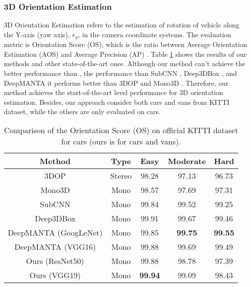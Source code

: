 \subsubsection{3D Orientation Estimation}
3D Orientation Estimation refers to the estimation of rotation of vehicle along the Y-axis (yaw axis), $r_y$, in the camera coordinate systems. The evaluation metric is Orientation Score (OS), which is the ratio between Average Orientation Estimation (AOS) and Average Precision (AP) \cite{DBLP:journals/corr/MousavianAFK16}. Table \ref{os_cmp} shows the results of our methods and other state-of-the-art ones. Although our method can't achieve the better performance than , the performance than SubCNN \cite{DBLP:journals/corr/XiangCLS16},  Deep3DBox \cite{DBLP:journals/corr/MousavianAFK16}, and DeepMANTA \cite{DBLP:journals/corr/ChabotCRTC17} it performs better than 3DOP \cite{Chen:2015:OPA:2969239.2969287} and Mono3D \cite{cvpr16chen}.  Therefore, our method achieves the start-of-the-art level performance for 3D orientation estimation. Besides, our approach consider both cars and vans from KITTI dataset, while the others are only evaluated on cars.

\begin{table}[H]
	\centering
	\caption{Comparison of the Orientation Score (OS) on official KITTI dataset for cars (ours is for cars and vans).}
	\label{os_cmp}
\begin{tabular}{|c|c|c|c|c|}
	\hline
	Method                                                                        & Type   & Easy           & Moderate       & Hard           \\ \hline
	3DOP \cite{Chen:2015:OPA:2969239.2969287}                    & Stereo & 98.28          & 97.13          & 96.73          \\ \hline
	Mono3D \cite{cvpr16chen}                                     & Mono   & 98.57          & 97.69          & 97.31          \\ \hline
	SubCNN \cite{DBLP:journals/corr/XiangCLS16}                  & Mono   & 99.84          & 99.52          & 99.25          \\ \hline
	Deep3DBox \cite{DBLP:journals/corr/MousavianAFK16}           & Mono   & 99.91 & 99.67          & 99.46          \\ \hline
	DeepMANTA (GoogLeNet) \cite{DBLP:journals/corr/ChabotCRTC17} & Mono   & 99.85          & \textbf{99.75} & \textbf{99.55} \\ \hline
	DeepMANTA (VGG16) \cite{DBLP:journals/corr/ChabotCRTC17}     & Mono   & 99.88          & 99.69          & 99.49          \\ \hline
	Ours (ResNet50)                                                               & Mono   & 99.88          & 98.78          & 97.39          \\ \hline
	Ours (VGG19)																	& Mono	 & \textbf{99.94}	       & 99.09	      & 98.43         \\ \hline
	
\end{tabular}
\end{table}

